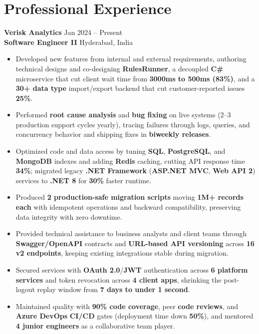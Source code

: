 \documentclass[a4paper,10pt]{article}
\begin{document}
\section*{Professional Experience}

\textbf{Verisk Analytics} \hfill Jan 2024 -- Present \\
\textbf{Software Engineer II} \hfill Hyderabad, India

\begin{itemize}[leftmargin=*]
    \item Developed new features from internal and external requirements, authoring technical designs and co-designing \textbf{RulesRunner}, a decoupled \textbf{C\#} microservice that cut client wait time from \textbf{3000ms to 500ms (83\%)}, and a \textbf{30+ data type} import/export backend that cut customer-reported issues \textbf{25\%}.
    \item Performed \textbf{root cause analysis} and \textbf{bug fixing} on live systems (2--3 production support cycles yearly), tracing failures through logs, queries, and concurrency behavior and shipping fixes in \textbf{biweekly releases}.
    \item Optimized code and data access by tuning \textbf{SQL}, \textbf{PostgreSQL}, and \textbf{MongoDB} indexes and adding \textbf{Redis} caching, cutting API response time \textbf{34\%}; migrated legacy \textbf{.NET Framework} (\textbf{ASP.NET MVC}, \textbf{Web API 2}) services to \textbf{.NET 8} for \textbf{30\%} faster runtime.
    \item Produced \textbf{2 production-safe migration scripts} moving \textbf{1M+ records each} with idempotent operations and backward compatibility, preserving data integrity with zero downtime.
    \item Provided technical assistance to business analysts and client teams through \textbf{Swagger/OpenAPI} contracts and \textbf{URL-based API versioning} across \textbf{16 v2 endpoints}, keeping existing integrations stable during migration.
    \item Secured services with \textbf{OAuth 2.0}/\textbf{JWT} authentication across \textbf{6 platform services} and token revocation across \textbf{4 client apps}, shrinking the post-logout replay window from \textbf{7 days to under 1 second}.
    \item Maintained quality with \textbf{90\% code coverage}, peer \textbf{code reviews}, and \textbf{Azure DevOps} \textbf{CI/CD} gates (deployment time down \textbf{50\%}), and mentored \textbf{4 junior engineers} as a collaborative team player.
\end{itemize}
\end{document}
